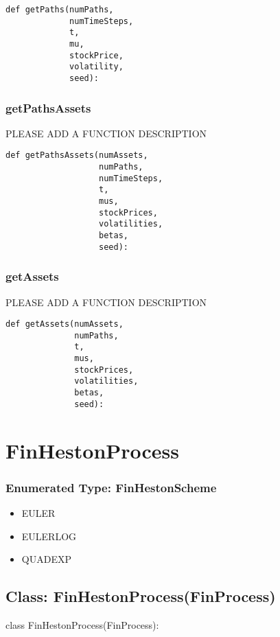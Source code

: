 \documentclass[twoside,11pt]{book}
\begin{document}
\begin{lstlisting}
def getPaths(numPaths,
             numTimeSteps,
             t,
             mu,
             stockPrice,
             volatility,
             seed):
\end{lstlisting}

\subsubsection*{{\bf getPathsAssets}}
PLEASE ADD A FUNCTION DESCRIPTION

\begin{lstlisting}
def getPathsAssets(numAssets,
                   numPaths,
                   numTimeSteps,
                   t,
                   mus,
                   stockPrices,
                   volatilities,
                   betas,
                   seed):
\end{lstlisting}

\subsubsection*{{\bf getAssets}}
PLEASE ADD A FUNCTION DESCRIPTION

\begin{lstlisting}
def getAssets(numAssets,
              numPaths,
              t,
              mus,
              stockPrices,
              volatilities,
              betas,
              seed):
\end{lstlisting}

\newpage
\section{FinHestonProcess}

\subsubsection{Enumerated Type: FinHestonScheme}
\begin{itemize}
\item{EULER}
\item{EULERLOG}
\item{QUADEXP}
\end{itemize}

\subsection*{Class: FinHestonProcess(FinProcess)}
class FinHestonProcess(FinProcess): 
\end{document}
